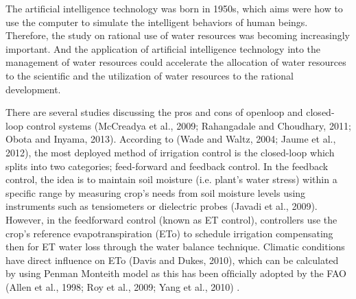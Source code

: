 \documentclass[letterpaper, 10 pt, conference]{ieeeconf}  %
\begin{document}
The artificial intelligence technology was born in 1950s, which aims were how to use the computer to simulate the intelligent behaviors of human beings. Therefore, the study on rational use of water resources was becoming increasingly important. And the application of artificial intelligence technology into the management of water resources could accelerate the allocation of water resources to the scientific and the utilization of water resources to the rational development\cite{chen2010application}.

There are several studies discussing the pros and cons of openloop and closed-loop control systems (McCreadya et al., 2009; Rahangadale and Choudhary, 2011; Obota and Inyama, 2013). According to (Wade and Waltz, 2004; Jaume et al., 2012), the most deployed method of irrigation control is the closed-loop which splits into two categories; feed-forward and feedback control. In the feedback control, the idea is to maintain soil moisture (i.e. plant’s water stress) within a speciﬁc range by measuring crop’s needs from soil moisture levels using instruments such as tensiometers or dielectric probes (Javadi et al., 2009). However, in the feedforward control (known as ET control), controllers use the crop’s reference evapotranspiration (ETo) to schedule irrigation compensating then for ET water loss through the water balance technique. Climatic conditions have direct inﬂuence on ETo (Davis and Dukes, 2010), which can be calculated by using Penman Monteith model as this has been ofﬁcially adopted by the FAO (Allen et al., 1998; Roy et al., 2009; Yang et al., 2010) \cite{Touati2013}. \\
\end{document}
